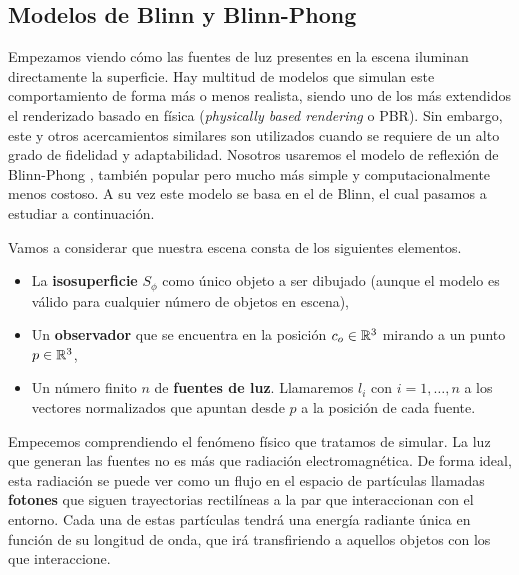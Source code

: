 \subsection{Modelos de Blinn y Blinn-Phong}
Empezamos viendo cómo las fuentes de luz presentes en la escena iluminan directamente la superficie. Hay multitud de modelos que simulan este comportamiento de forma más o menos realista, siendo uno de los más extendidos el renderizado basado en física (\textit{physically based rendering} o PBR). Sin embargo, este y otros acercamientos similares son utilizados cuando se requiere de un alto grado de fidelidad y adaptabilidad. Nosotros usaremos el modelo de reflexión de Blinn-Phong \cite{apuntes:ig}, también popular pero mucho más simple y computacionalmente menos costoso. A su vez este modelo se basa en el de Blinn, el cual pasamos a estudiar a continuación. \newline

Vamos a considerar que nuestra escena consta de los siguientes elementos.
\begin{itemize}
    \item La \textbf{isosuperficie} $S_{\phi}$ como único objeto a ser dibujado (aunque el modelo es válido para cualquier número de objetos en escena),
    \item Un \textbf{observador} que se encuentra en la posición $c_o\in\mathbb{R}^3$ mirando a un punto $p\in \mathbb{R}^3$,
    \item Un número finito $n$ de \textbf{fuentes de luz}. Llamaremos $l_i$ con $i=1,\dots, n$ a los vectores normalizados que apuntan desde $p$ a la posición de cada fuente.
\end{itemize}

Empecemos comprendiendo el fenómeno físico que tratamos de simular. La luz que generan las fuentes no es más que radiación electromagnética. De forma ideal, esta radiación se puede ver como un flujo en el espacio de partículas llamadas \textbf{fotones} que siguen trayectorias rectilíneas a la par que interaccionan con el entorno. Cada una de estas partículas tendrá una energía radiante única en función de su longitud de onda, que irá transfiriendo a aquellos objetos con los que interaccione.

